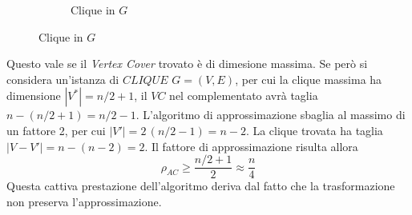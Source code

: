 \begin{figure}[h]
\begin{subfigure}[b]{0.3\textwidth}
    \end{subfigure}
    \quad
    \begin{subfigure}[b]{0.3\textwidth}
        \centering
        \caption{Clique in $G$}
        \label{fig:approxclique3}
    \end{subfigure}
\end{figure}
Questo vale se il \emph{Vertex Cover} trovato è di dimesione massima. Se però si considera un'istanza di $CLIQUE$ $G=(V,E)$,
per cui la clique massima ha dimensione $|V^*|=n/2+1$, il $VC$ nel complementato avrà taglia $n-\left( n/2 +1 \right) = n/2 -1$. L'algoritmo di approssimazione sbaglia al massimo di un fattore 2, per cui $|V'|=2 \, \left( n/2 -1 \right) = n-2$. La clique trovata ha taglia $|V-V'|=n-\left( n-2 \right) = 2$. Il fattore di approssimazione risulta allora
\begin{equation*}
    \rho_{AC} \geq \frac{n/2+1}{2} \approx \frac{n}{4}
\end{equation*}
Questa cattiva prestazione dell'algoritmo deriva dal fatto che la trasformazione non preserva l'approssimazione.


